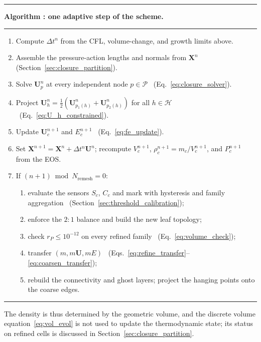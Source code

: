 \documentclass[a4paper]{cas-sc}
\newcounter{algorithm}
\begin{document}
\par\medskip{}%
\noindent\rule{\linewidth}{0.9pt}
\par\noindent\textbf{Algorithm \thealgorithm: one adaptive step of the scheme.}\label{alg:amr_step}
\par\noindent\rule{\linewidth}{0.4pt}
\par\smallskip
\begin{enumerate}\setlength{\itemsep}{1pt}
	\item Compute $\Delta t^n$ from the CFL, volume-change, and growth limits above.
	\item Assemble the pressure-action lengths and normals from $\boldsymbol X^n$ (Section~\ref{sec:closure_partition}).
	\item Solve $\boldsymbol U_p^n$ at every independent node $p\in\mathcal P$ \ (Eq.~\eqref{eq:closure_solver}).
	\item Project $\boldsymbol U_h^n=\tfrac12(\boldsymbol U_{p_1(h)}^n+\boldsymbol U_{p_2(h)}^n)$ for all $h\in\mathcal H$ \ (Eq.~\eqref{eq:U_h_constrained}).
	\item Update $\boldsymbol U_c^{n+1}$ and $E_c^{n+1}$ \ (Eq.~\eqref{eq:fe_update}).
	\item Set $\boldsymbol X^{n+1}=\boldsymbol X^n+\Delta t^n\boldsymbol U^n$; recompute $V_c^{n+1}$, $\rho_c^{n+1}=m_c/V_c^{n+1}$, and $P_c^{n+1}$ from the EOS.
	\item If $(n+1)\bmod N_{\mathrm{remesh}}=0$:
	\begin{enumerate}\setlength{\itemsep}{1pt}
		\item evaluate the sensors $S_c$, $C_c$ and mark with hysteresis and family aggregation \ (Section~\ref{sec:threshold_calibration});
		\item enforce the $2\!:\!1$ balance and build the new leaf topology;
		\item check $r_P\le10^{-12}$ on every refined family \ (Eq.~\eqref{eq:volume_check});
		\item transfer $(m,m\boldsymbol U,mE)$ \ (Eqs.~\eqref{eq:refine_transfer}--\eqref{eq:coarsen_transfer});
		\item rebuild the connectivity and ghost layers; project the hanging points onto the coarse edges.
	\end{enumerate}
\end{enumerate}
\noindent\rule{\linewidth}{0.9pt}
\medskip

The density is thus determined by the geometric volume, and the discrete volume equation~\eqref{eq:vol_evol} is not used to update the thermodynamic state; its status on refined cells is discussed in Section~\ref{sec:closure_partition}.
\end{document}
